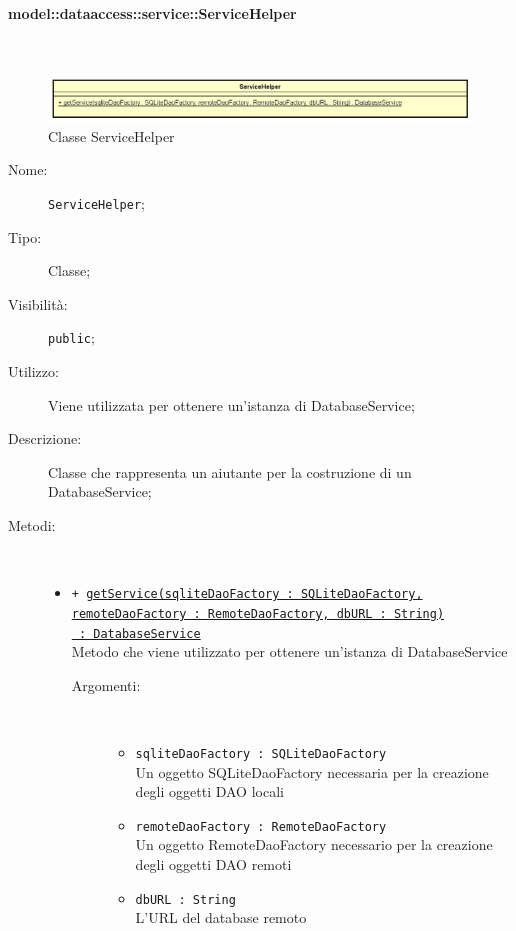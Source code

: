 \documentclass[../DefinizioneDiProdotto.tex]{subfiles}
\begin{document}
\paragraph{model::dataaccess::service::ServiceHelper}
\
\begin{figure}[H]
	\centering
	\includegraphics[width=\maxwidth]{img/ServiceHelper.png}
	\caption{Classe ServiceHelper}\label{fig:model::dataaccess::service::ServiceHelper} 
\end{figure}
\begin{description}
	\item[Nome:] \texttt{ServiceHelper};
	\item[Tipo:] Classe;
	\item[Visibilità:] \texttt{public};
	\item[Utilizzo:] Viene utilizzata per ottenere un'istanza di DatabaseService;
	\item[Descrizione:] Classe che rappresenta un aiutante per la costruzione di un DatabaseService;
	\item[Metodi:] \
	\begin{itemize}
		\item \texttt{+ \underline{getService(sqliteDaoFactory : SQLiteDaoFactory,} \\ \underline{remoteDaoFactory : RemoteDaoFactory, dbURL : String)} \\ \underline{ : DatabaseService}}\\
		Metodo che viene utilizzato per ottenere un'istanza di DatabaseService
		\begin{description}
			\item[Argomenti:] \
			\begin{itemize}
				\item \texttt{sqliteDaoFactory : SQLiteDaoFactory}\\
				Un oggetto SQLiteDaoFactory necessaria per la creazione degli oggetti DAO locali\item \texttt{remoteDaoFactory : RemoteDaoFactory}\\
				Un oggetto RemoteDaoFactory necessario per la creazione degli oggetti DAO remoti\item \texttt{dbURL : String}\\
				L'URL del database remoto\end{itemize}
		\end{description}
	\end{itemize}
\end{description}
\end{document}
